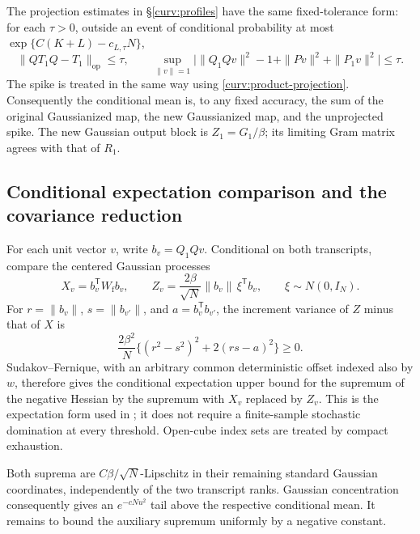 \documentclass[11pt,reqno]{amsart}
\begin{document}
The projection estimates in \S\ref{curv:profiles} have the same
fixed-tolerance form: for each $\tau>0$, outside an event of conditional
probability at most $\exp\{C(K+L)-c_{L,\tau}N\}$,
\[
 \|QT_1Q-T_1\|_{\mathrm{op}}\le\tau,\qquad
 \sup_{\|v\|=1}
 \bigl|\|Q_1Qv\|^2-1+\|Pv\|^2+\|P_1v\|^2\bigr|\le\tau.
\]
The spike is treated in the same way using
\eqref{curv:product-projection}. Consequently the conditional mean is,
to any fixed accuracy, the sum of the original Gaussianized map, the
new Gaussianized map, and the unprojected spike. The new Gaussian output
block is $Z_1=G_1/\beta$; its limiting Gram matrix agrees with that of
$R_1$.

\subsection{Conditional expectation comparison and the covariance reduction}
\label{curv:sf}

For each unit vector $v$, write $b_v=Q_1Qv$. Conditional on both
transcripts, compare the centered Gaussian processes
\[
        X_v=b_v^{\mathsf T}W_{\mathrm f}b_v,
        \qquad
        Z_v=\frac{2\beta}{\sqrt N}\|b_v\|\,\xi^{\mathsf T}b_v,
        \qquad \xi\sim N(0,I_N).
\]
For $r=\|b_v\|$, $s=\|b_{v'}\|$, and $a=b_v^{\mathsf T}b_{v'}$,
the increment variance of $Z$ minus that of $X$ is
\[
       \frac{2\beta^2}{N}\{(r^2-s^2)^2+2(rs-a)^2\}\ge0.
\]
Sudakov--Fernique, with an arbitrary common deterministic offset indexed
also by $w$, therefore gives the conditional expectation upper bound for
the supremum of the negative Hessian by the supremum with $X_v$ replaced
by $Z_v$. This is the expectation form used in
\cite[Eq.~(4.5)]{brennecke2023operator}; it does not require a finite-sample stochastic
domination at every threshold. Open-cube index sets are treated by compact
exhaustion.

Both suprema are $C\beta/\sqrt N$-Lipschitz in their remaining standard
Gaussian coordinates, independently of the two transcript ranks.
Gaussian concentration \cite{boucheron2013concentration} consequently
gives an $e^{-cN u^2}$ tail above
the respective conditional mean. It remains to bound the auxiliary
supremum uniformly by a negative constant.
\end{document}
